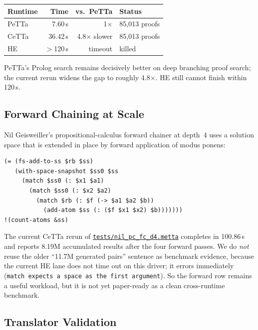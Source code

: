 \documentclass[11pt]{article}
\newcommand{\code}[1]{\texttt{#1}}
\newcommand{\PeTTa}{\textup{PeTTa}}
\newcommand{\HE}{\textup{HE}}
\newcommand{\CeTTa}{\textup{CeTTa}}
\begin{document}
\begin{center}
\begin{tabular}{lrrl}
\toprule
Runtime & Time & vs.\ \PeTTa{} & Status \\
\midrule
\PeTTa{} & 7.60\,s  & 1$\times$          & 85{,}013 proofs \\
\CeTTa{} & 36.42\,s & 4.8$\times$ slower & 85{,}013 proofs \\
\HE{}    & $>$120\,s & timeout            & killed \\
\bottomrule
\end{tabular}
\end{center}

\PeTTa{}'s Prolog search remains decisively better on deep branching
proof search; the current rerun widens the gap to roughly
4.8$\times$.  \HE{} still cannot finish within 120\,s.

\subsection{Forward Chaining at Scale}

Nil Geisweiller's propositional-calculus forward chainer at depth~4
uses a solution space that is extended in place by forward application
of modus ponens:
\begin{lstlisting}[language={},basicstyle=\ttfamily\scriptsize]
(= (fs-add-to-ss $rb $ss)
   (with-space-snapshot $ss0 $ss
     (match $ss0 (: $x1 $a1)
       (match $ss0 (: $x2 $a2)
         (match $rb (: $f (-> $a1 $a2 $b))
           (add-atom $ss (: ($f $x1 $x2) $b)))))))
!(count-atoms &ss)
\end{lstlisting}
The current \CeTTa{} rerun of
\href{https://github.com/zariuq/CeTTa/blob/07928677c0237a19b2f3c32dffca28d7d2626723/tests/nil_pc_fc_d4.metta}{\code{tests/nil\_pc\_fc\_d4.metta}}
completes in 100.86\,s and reports 8.19M accumulated results after the
four forward passes.  We do \emph{not} reuse the older
``11.7M generated pairs'' sentence as benchmark evidence, because the
current HE lane does not time out on this driver; it errors immediately
(\code{match expects a space as the first argument}).  So the forward
row remains a useful workload, but it is not yet paper-ready as a clean
cross-runtime benchmark.

\subsection{Translator Validation}
\end{document}
